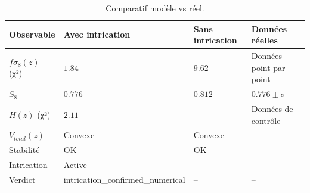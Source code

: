 \begin{table}[htbp]
\centering
\caption{Comparatif modèle vs réel.}
\begin{tabular}{>{\raggedright\arraybackslash}p{4.1cm} >{\centering\arraybackslash}p{3cm} >{\centering\arraybackslash}p{3cm} >{\raggedright\arraybackslash}p{3.2cm}}
\toprule
Observable & Avec intrication & Sans intrication & Données réelles \\
\midrule
$f\sigma_8(z)$ (χ²) & $1.84$ & $9.62$ & Données point par point \\
$S_8$ & $0.776$ & $0.812$ & $0.776 \pm \sigma$ \\
$H(z)$ (χ²) & $2.11$ & -- & Données de contrôle \\
$V_{total}(z)$ & Convexe & Convexe & -- \\
Stabilité & OK & OK & -- \\
Intrication & Active & -- & -- \\
Verdict & intrication\_confirmed\_numerical & -- & -- \\
\bottomrule
\end{tabular}
\end{table}